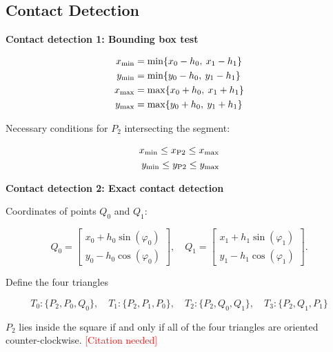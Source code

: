 \subsection{Contact Detection}

\textbf{Contact detection 1: Bounding box test}

\begin{align*}
x_{\rm{min}} &= \min\{x_0 - h_0,\:x_1 - h_1\}\\
y_{\rm{min}} &= \min\{y_0 - h_0,\:y_1 - h_1\}\\
x_{\rm{max}} &= \max\{x_0 + h_0,\:x_1 + h_1\}\\
y_{\rm{max}} &= \max\{y_0 + h_0,\:y_1 + h_1\}
\end{align*}

Necessary conditions for $P_2$ intersecting the segment:

\begin{align*}
x_{\rm{min}} \le x_{\rm{P2}} \le x_{\rm{max}}\\
y_{\rm{min}} \le y_{\rm{P2}} \le y_{\rm{max}}
\end{align*}

\textbf{Contact detection 2: Exact contact detection}

Coordinates of points $Q_0$ and $Q_1$:

\begin{equation*}
Q_0 = \begin{bmatrix}
x_{0} + h_{0}\sin(\varphi_{0}) \\
y_{0} - h_{0}\cos(\varphi_{0})
\end{bmatrix},\quad
Q_1 = \begin{bmatrix}
x_{1} + h_{1}\sin(\varphi_{1}) \\
y_{1} - h_{1}\cos(\varphi_{1})
\end{bmatrix}.
\end{equation*}

Define the four triangles

\begin{equation*}
T_{0} : \{ P_2, P_0, Q_0 \},\quad T_{1} : \{ P_2, P_1, P_0 \},\quad T_{2} : \{ P_2, Q_0, Q_1 \},\quad T_{3} : \{ P_2, Q_1, P_1 \}
\end{equation*}

$P_2$ lies inside the square if and only if all of the four triangles are oriented counter-clockwise. \textcolor{red}{[Citation needed]} %

